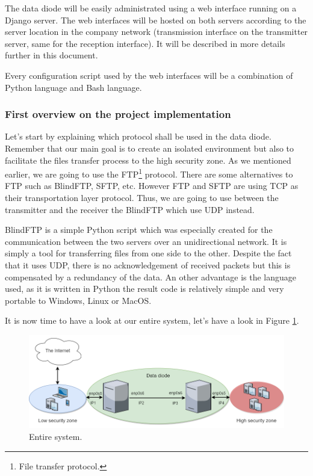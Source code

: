 \documentclass[a4paper,10pt]{article}
\begin{document}
The data diode will be easily administrated using a web interface running on a Django server. The web interfaces will be hosted on both servers according to the server location in the company network (transmission interface on the transmitter server, same for the reception interface). It will be described in more details further in this document.

Every configuration script used by the web interfaces will be a combination of Python language and Bash language.
\subsubsection{First overview on the project implementation}

Let's start by explaining which protocol shall be used in the data diode. Remember that our main goal is to create an isolated environment but also to facilitate the files transfer process to the high security zone. As we mentioned earlier, we are going to use the FTP\footnote{File transfer protocol.} protocol. There are some alternatives to FTP such as BlindFTP, SFTP, etc. However FTP and SFTP are using TCP as their transportation layer protocol. Thus, we are going to use between the transmitter and the receiver the BlindFTP which use UDP instead.

BlindFTP is a simple Python script which was especially created for the communication between the two servers over an unidirectional network. It is simply a tool for transferring files from one side to the other. Despite the fact that it uses UDP, there is no acknowledgement of received packets but this is compensated by a redundancy of the data. An other advantage is the language used, as it is written in Python the result code is relatively simple and very portable to Windows, Linux or MacOS.

It is now time to have a look at our entire system, let's have a look in Figure \ref{fig:sysschem}.\bigskip

\begin{figure}
\centering
\includegraphics[scale=0.5]{images/DataDiodeSchema.png}
\caption{Entire system.}
\label{fig:sysschem}
\end{figure}
\end{document}
